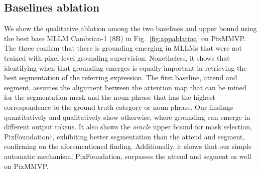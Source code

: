 \subsection{Baselines ablation}
We show the qualitative ablation among the two baselines and upper bound using the best base MLLM Cambrian-1 (8B) in Fig.~\ref{fig:appablation} on PixMMVP. The three  confirm that there is grounding emerging in MLLMs that were not trained with pixel-level grounding supervision. Nonetheless, it shows that identifying when that grounding emerges is equally important in retrieving the best segmentation of the referring expression. The first baseline, attend and segment, assumes the alignment between the attention map that can be mined for the segmentation mask and the noun phrase that has the highest correspondence to the ground-truth category or noun phrase. Our findings quantitatively and qualitatively show otherwise, where grounding can emerge in different output tokens. It also shows the \textit{oracle} upper bound for mask selection, PixFoundation$\dagger$, exhibiting better segmentation than the attend and segment, confirming on the aforementioned finding. Additionally, it shows that our simple automatic mechanism, PixFoundation, surpasses the attend and segment as well on PixMMVP.

